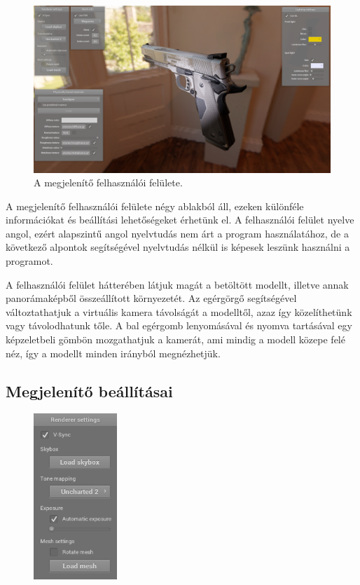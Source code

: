\begin{figure}[!ht]
    \centering
    \includegraphics[width=1.0\textwidth]{images/screenshot.png}
    \caption{A megjelenítő felhasználói felülete.}
\end{figure}

A megjelenítő felhasználói felülete négy ablakból áll, ezeken különféle információkat és beállítási lehetőségeket érhetünk el. A felhasználói felület nyelve angol, ezért alapszintű angol nyelvtudás nem árt a program használatához, de a következő alpontok segítségével nyelvtudás nélkül is képesek leszünk használni a programot.

A felhasználói felület hátterében látjuk magát a betöltött modellt, illetve annak panorámaképből összeállított környezetét. Az egérgörgő segítségével változtathatjuk a virtuális kamera távolságát a modelltől, azaz így közelíthetünk vagy távolodhatunk tőle. A bal egérgomb lenyomásával és nyomva tartásával egy képzeletbeli gömbön mozgathatjuk a kamerát, ami mindig a modell közepe felé néz, így a modellt minden irányból megnézhetjük.

\clearpage

\subsection{Megjelenítő beállításai}

\begin{figure}
    \vspace{-23pt}
    \includegraphics[width=0.28\textwidth]{images/renderer_settings.png}
    \vspace{-20pt}
\end{figure}


